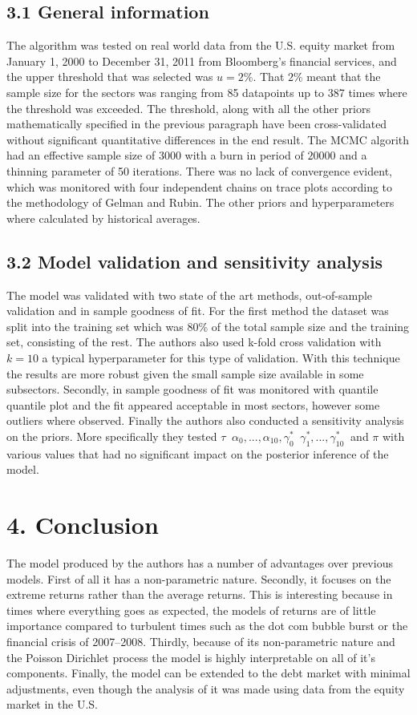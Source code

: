 \documentclass[fleqn, a4paper]{report}
\begin{document}
\subsection*{3.1 General information}
The algorithm was tested on real world data from the U.S. equity market from January 1, 2000 to December 31, 2011 from Bloomberg's financial services, and the upper threshold that was selected was $u=2\%$. That $2\%$ meant that the sample size for the sectors was ranging from 85 datapoints up to 387 times where the threshold was exceeded. The threshold, along with all the other priors mathematically specified in the previous paragraph have been cross-validated without significant quantitative differences in the end result. The MCMC algorith had an effective sample size of $3000$ with a burn in period of $20000$ and a thinning parameter of 50 iterations. There was no lack of convergence evident, which was monitored with four independent chains on trace plots according to the methodology of Gelman and Rubin. The other priors and hyperparameters where calculated by historical averages. 

\subsection*{3.2 Model validation and sensitivity analysis}
The model was validated with two state of the art methods, out-of-sample validation and in sample goodness of fit. For the first method the dataset was split into the training set which was 80\% of the total sample size and the training set, consisting of the rest. The authors also used k-fold cross validation with $k=10$ a typical hyperparameter for this type of validation. With this technique the results are more robust given the small sample size available in some subsectors. Secondly, in sample goodness of fit was monitored with quantile quantile plot and the fit appeared acceptable in most sectors, however some outliers where observed. Finally the authors also conducted a sensitivity analysis on the priors. More specifically they tested $\tau~$ $\alpha_0,...,\alpha_{10}, \gamma_0^*~$ $\gamma_1^*,...,\gamma_{10}^*~$ and $\pi$ with various values that had no significant impact on the posterior inference of the model.

\section*{4. Conclusion}
The model produced by the authors has a number of advantages over previous models. First of all it has a non-parametric nature. Secondly, it focuses on the extreme returns rather than the average returns. This is interesting because in times where everything goes as expected, the models of returns are of little importance compared to turbulent times such as the dot com bubble burst or the financial crisis of 2007–2008. Thirdly, because of its non-parametric nature and the Poisson Dirichlet process the model is highly interpretable on all of it's components. Finally, the model can be extended to the debt market with minimal adjustments, even though the analysis of it was made using data from the equity market in the U.S.



\end{document}
